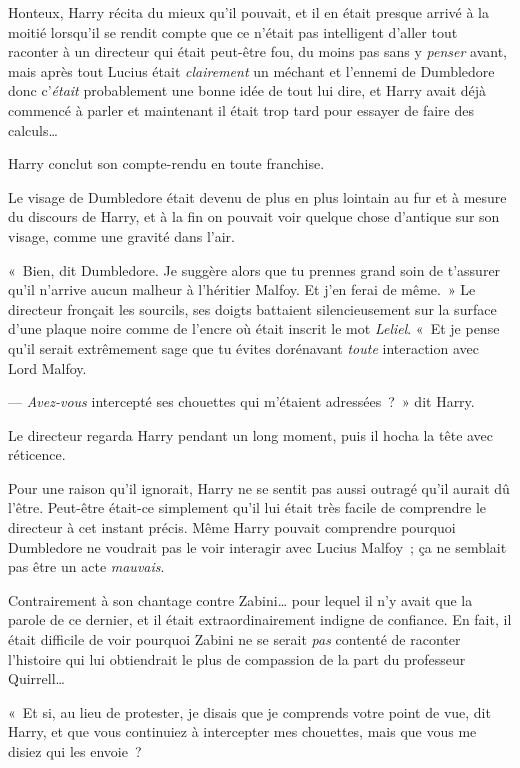 Honteux, Harry récita du mieux qu'il pouvait, et il en était presque arrivé à la moitié lorsqu'il se rendit compte que ce n'était pas intelligent d'aller tout raconter à un directeur qui était peut-être fou, du moins pas sans y \emph{penser} avant, mais après tout Lucius était \emph{clairement} un méchant et l'ennemi de Dumbledore donc c'\emph{était} probablement une bonne idée de tout lui dire, et Harry avait déjà commencé à parler et maintenant il était trop tard pour essayer de faire des calculs…

Harry conclut son compte-rendu en toute franchise.

Le visage de Dumbledore était devenu de plus en plus lointain au fur et à mesure du discours de Harry, et à la fin on pouvait voir quelque chose d'antique sur son visage, comme une gravité dans l'air.

«~Bien, dit Dumbledore. Je suggère alors que tu prennes grand soin de t'assurer qu'il n'arrive aucun malheur à l'héritier Malfoy. Et j'en ferai de même.~» Le directeur fronçait les sourcils, ses doigts battaient silencieusement sur la surface d'une plaque noire comme de l'encre où était inscrit le mot \emph{Leliel}. «~Et je pense qu'il serait extrêmement sage que tu évites dorénavant \emph{toute} interaction avec Lord Malfoy.

--- \emph{Avez-vous} intercepté ses chouettes qui m'étaient adressées~?~» dit Harry.

Le directeur regarda Harry pendant un long moment, puis il hocha la tête avec réticence.

Pour une raison qu'il ignorait, Harry ne se sentit pas aussi outragé qu'il aurait dû l'être. Peut-être était-ce simplement qu'il lui était très facile de comprendre le directeur à cet instant précis. Même Harry pouvait comprendre pourquoi Dumbledore ne voudrait pas le voir interagir avec Lucius Malfoy~; ça ne semblait pas être un acte \emph{mauvais}.

Contrairement à son chantage contre Zabini… pour lequel il n'y avait que la parole de ce dernier, et il était extraordinairement indigne de confiance. En fait, il était difficile de voir pourquoi Zabini ne se serait \emph{pas} contenté de raconter l'histoire qui lui obtiendrait le plus de compassion de la part du professeur Quirrell…

«~Et si, au lieu de protester, je disais que je comprends votre point de vue, dit Harry, et que vous continuiez à intercepter mes chouettes, mais que vous me disiez qui les envoie~?


